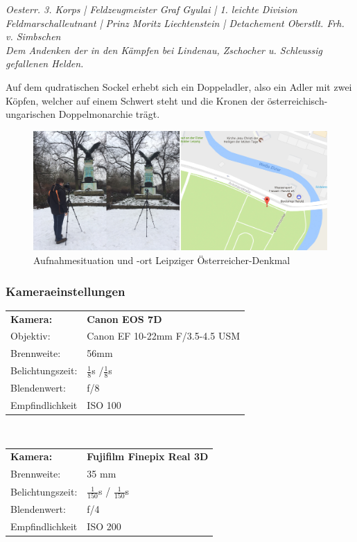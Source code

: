 \documentclass[liststotoc,bibtotoc,fontsize=14pt,]{scrreprt}
\begin{document}
\bigskip
\begin{center} 
	\textit{Oesterr. 3. Korps | Feldzeugmeister Graf Gyulai | 1. leichte Division Feldmarschalleutnant | Prinz Moritz Liechtenstein | Detachement Oberstlt. Frh. v. Simbschen\\
		Dem Andenken der in den Kämpfen bei Lindenau, Zschocher u. Schleussig gefallenen Helden.} 
\end{center}

\bigskip
Auf dem qudratischen Sockel erhebt sich ein Doppeladler, also ein Adler mit zwei Köpfen, welcher auf einem Schwert steht und die Kronen der österreichisch-ungarischen Doppelmonarchie trägt. 

		\begin{figure}[H]
			\includegraphics[width=\linewidth]{img/places/oer.jpg}
			\caption{Aufnahmesituation und -ort Leipziger Österreicher-Denkmal}
			\label{img:oer}
		\end{figure}
		
		\subsubsection{Kameraeinstellungen}
		\begin{tabular}{ll}
			\textbf{Kamera:} &\textbf{Canon EOS 7D} \\
			Objektiv: &Canon EF 10-22mm F/3.5-4.5 USM\\		
			Brennweite:& 56mm \\
			Belichtungszeit: & $\frac{1}{8}$s /$\frac{1}{8}$s\\
			Blendenwert: & f/8\\
			Empfindlichkeit & ISO 100 \\
		\end{tabular}\\
		
		\begin{tabular}{ll}
			\textbf{Kamera:} &\textbf{Fujifilm Finepix Real 3D} \\
			Brennweite:& 35 mm \\
			Belichtungszeit: & $\frac{1}{150}$s / $\frac{1}{150}$s\\
			Blendenwert: & f/4\\
			Empfindlichkeit & ISO 200 \\
		\end{tabular}\\
\end{document}
